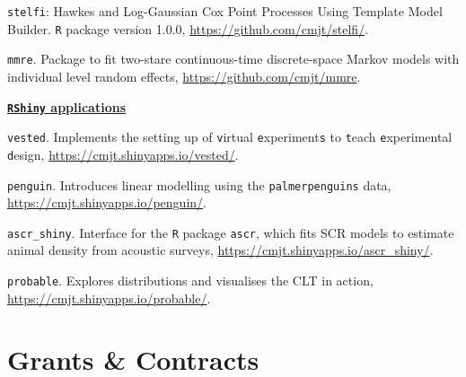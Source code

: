 \documentclass[10pt,a4paper]{moderncv}
\begin{document}
\texttt{stelfi}: Hawkes and Log-Gaussian Cox Point Processes Using Template Model Builder. \texttt{R} package version 1.0.0, \url{https://github.com/cmjt/stelfi/}.\\

\vspace{-3pt}

\texttt{mmre}. Package to fit two-stare continuous-time discrete-space Markov models with individual level random effects, \url{https://github.com/cmjt/mmre}.\\


\vspace{2pt}

\underline{\textbf{\texttt{RShiny} applications}}\\
\vspace{-3pt}

\texttt{vested}. Implements the setting up of \texttt{v}irtual \texttt{e}xperiment\texttt{s} to \texttt{t}each \texttt{e}xperimental \texttt{d}esign, \url{https://cmjt.shinyapps.io/vested/}.\\

\vspace{-3pt}

\texttt{penguin}. Introduces linear modelling using the \texttt{palmerpenguins} data, \url{https://cmjt.shinyapps.io/penguin/}.\\

\vspace{-3pt}

\texttt{ascr\_shiny}. Interface for the \texttt{R} package \texttt{ascr}, which fits SCR models to estimate animal density from acoustic surveys, \url{https://cmjt.shinyapps.io/ascr_shiny/}.\\

\vspace{-3pt}

\texttt{probable}. Explores distributions and visualises the CLT in action, \url{https://cmjt.shinyapps.io/probable/}.\\

\section{Grants \& Contracts}
\end{document}
